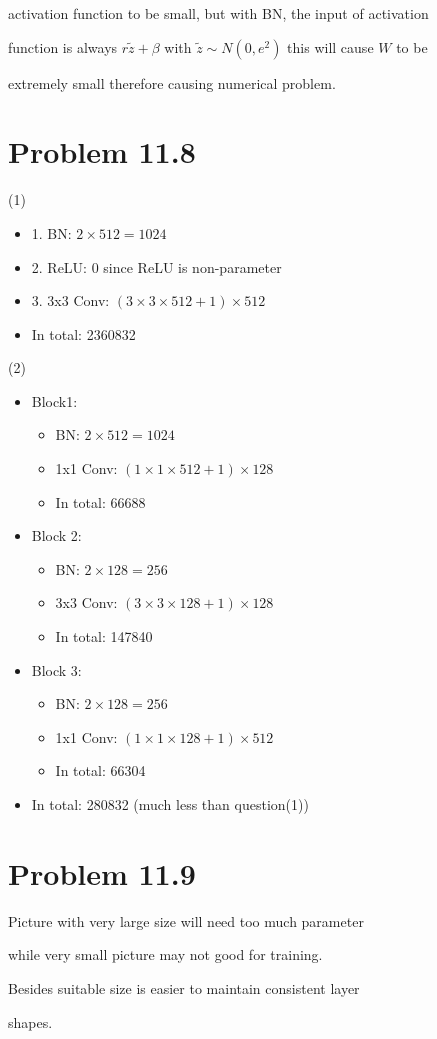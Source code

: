 \documentclass{article}
\begin{document}
\noindent activation function to be small, but with BN, the input of activation

\noindent function is always $r\tilde{z}+\beta$ with $\tilde{z} \sim N(0,e^2)$ this will cause $W$ to be

\noindent extremely small therefore causing numerical problem.

\section*{Problem 11.8}
(1) 
\begin{itemize}
    \item 1. BN: $2 \times 512 = 1024$ 
    \item 2. ReLU: 0 since ReLU is non-parameter
    \item 3. 3x3 Conv: $(3 \times 3 \times 512 + 1) \times 512$
    \item In total: 2360832
\end{itemize}

(2) 
\begin{itemize}
    \item Block1: 
    \begin{itemize}
        \item BN: $2 \times 512 = 1024$ 
        \item 1x1 Conv: $(1 \times 1 \times 512 + 1) \times 128$
        \item In total: 66688
    \end{itemize}
    
    \item Block 2: 
    \begin{itemize}
        \item BN: $2 \times 128 = 256$ 
        \item 3x3 Conv: $(3 \times 3 \times 128 + 1) \times 128$
        \item In total: 147840
    \end{itemize}
    
    \item Block 3: 
    \begin{itemize}
        \item BN: $2 \times 128 = 256$ 
        \item 1x1 Conv: $(1 \times 1 \times 128 + 1) \times 512$
        \item In total: 66304
    \end{itemize}
    
    \item In total: 280832 (much less than question(1))
\end{itemize}

\section*{Problem 11.9}
Picture with very large size will need too much parameter

\noindent while very small picture may not good for training.

\noindent Besides suitable size is easier to maintain consistent layer

\noindent shapes.
\end{document}
